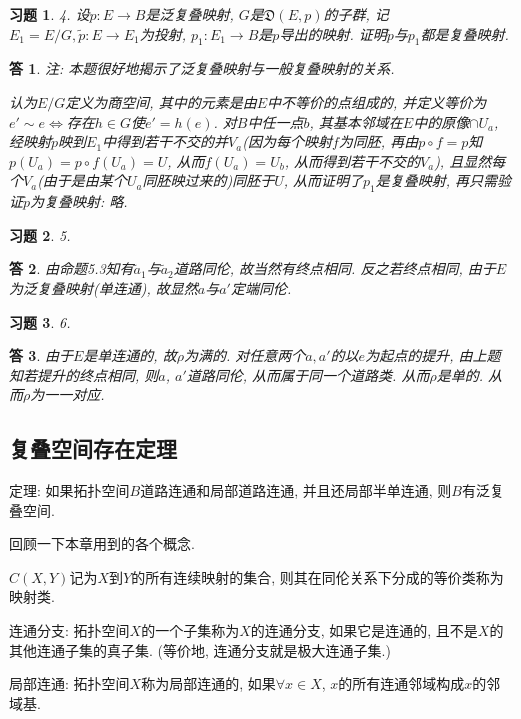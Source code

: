 \documentclass{ctexart}%
\newtheorem*{exercise}{习题}
\newtheorem*{solution}{答}
\theoremstyle{definition}
\theoremstyle{remark}
\begin{document}
\begin{exercise}4. 设$p:E\rightarrow B$是泛复叠映射, $G$是$\mathfrak{D}(E,p)$的子群, 记$E_1=E/G, \tilde{p}:E\rightarrow E_1$为投射, $p_1:E_1\rightarrow B$是$p$导出的映射. 证明$\tilde{p}$与$p_1$都是复叠映射. 
\end{exercise}
\begin{solution}
注: 本题很好地揭示了泛复叠映射与一般复叠映射的关系. 

认为$E/G$定义为商空间, 其中的元素是由$E$中不等价的点组成的, 并定义等价为$e'\sim e\Leftrightarrow$存在$h\in G$使$e'=h(e)$. 对$B$中任一点$b$, 其基本邻域在$E$中的原像$\cap U_a$, 经映射$\tilde{p}$映到$E_1$中得到若干不交的并$V_a$(因为每个映射$f$为同胚, 再由$p\circ f= p$知$p(U_a)=p\circ f(U_a)=U$, 从而$f(U_a)=U_b$, 从而得到若干不交的$V_a$), 且显然每个$V_a$(由于是由某个$U_a$同胚映过来的)同胚于$U$, 从而证明了$p_1$是复叠映射, 再只需验证$\tilde{p}$为复叠映射: 略.
\end{solution}

\begin{exercise}5.
\end{exercise}
\begin{solution}
由命题5.3知有$\tilde{a}_1$与$\tilde{a}_2$道路同伦, 故当然有终点相同. 反之若终点相同, 由于$E$为泛复叠映射(单连通), 故显然$a$与$a'$定端同伦.
\end{solution}

\begin{exercise}6.
\end{exercise}
\begin{solution}
由于$E$是单连通的, 故$\rho$为满的. 对任意两个$a,a'$的以$e$为起点的提升, 由上题知若提升的终点相同, 则$a$, $a'$道路同伦, 从而属于同一个道路类. 从而$\rho$是单的. 从而$\rho$为一一对应. 
\end{solution}

\subsection{复叠空间存在定理}

定理: 如果拓扑空间$B$道路连通和局部道路连通, 并且还局部半单连通, 则$B$有泛复叠空间. 

回顾一下本章用到的各个概念.

$C(X,Y)$记为$X$到$Y$的所有连续映射的集合, 则其在同伦关系下分成的等价类称为映射类. 

连通分支: 拓扑空间$X$的一个子集称为$X$的连通分支, 如果它是连通的, 且不是$X$的其他连通子集的真子集.  (等价地, 连通分支就是极大连通子集.)

局部连通: 拓扑空间$X$称为局部连通的, 如果$\forall x\in X$, $x$的所有连通邻域构成$x$的邻域基. 
\end{document}
